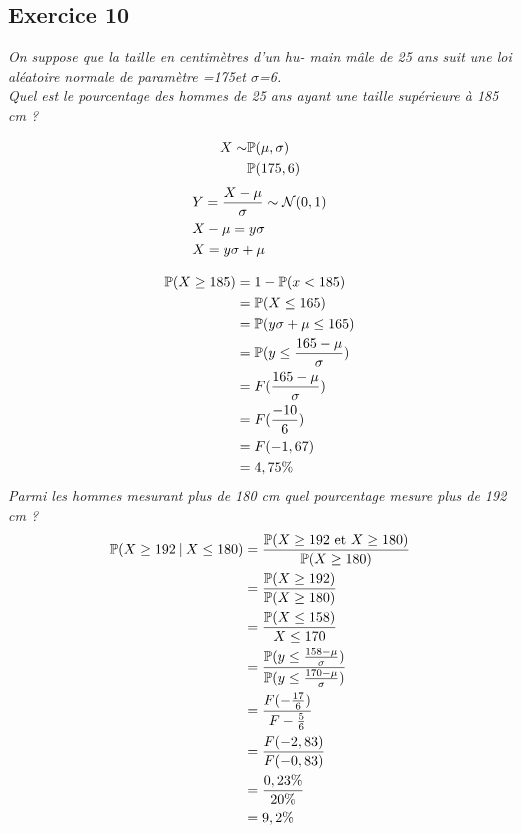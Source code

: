 \subsection*{Exercice 10 }
\textit{On suppose que la taille en centimètres d’un hu- main mâle de 25 ans suit une loi aléatoire normale de paramètre \textmu{}=175et $\sigma$=6.\\
Quel est le pourcentage des hommes de 25 ans ayant une taille supérieure à 185 cm ?}
\\
\begin{multicols}{2}
\begin{align*}
    X \sim &\mathbb{P}(\mu,\sigma)\\
    &\mathbb{P}(175, 6)
\end{align*}
\begin{align*}
    &Y = \frac{X - \mu}{\sigma} \sim \mathcal{N}(0,1)\\
    &X - \mu = y\sigma
    \\&X =  y\sigma + \mu
\end{align*}
\end{multicols}
\begin{align*}
    \mathbb{P}(X \geq 185) &= 1 - \mathbb{P}(x < 185)\\
    &= \mathbb{P}(X \leq 165)\\
    &=\mathbb{P}(y\sigma + \mu \leq 165)\\
    &=\mathbb{P}(y\leq \frac{165 - \mu}{\sigma})\\
    &= F(\frac{165 -  \mu}{\sigma})\\
    &= F( \frac{-10}{6})\\
    &= F(-1,67)\\
    &= 4,75 \%
\end{align*}
\textit{Parmi les hommes mesurant plus de 180 cm quel pourcentage mesure plus de 192 cm ?}\\
\begin{align*}
    \mathbb{P}(X \geq 192 \:\vert\: X \leq 180) &=  \frac{\mathbb{P}(X \geq 192 \text{ et } X \geq 180 )}{\mathbb{P}(X \geq 180)}\\
    &= \frac{\mathbb{P}(X \geq 192)}{\mathbb{P} (X \geq 180)}\\
    &=\frac{\mathbb{P}(X \leq 158)}{X \leq 170}\\
    &= \frac{\mathbb{P}(y \leq \frac{158 - \mu}{\sigma})}{\mathbb{P}(y \leq \frac{170 - \mu}{\sigma})}\\
    &= \frac{F(-\frac{17}{6})}{F-\frac{5}{6}}\\
    &= \frac{F(-2,83)}{F(-0,83)}\\
    &= \frac{0,23 \%}{20\%}\\
    &= 9,2\%
\end{align*}